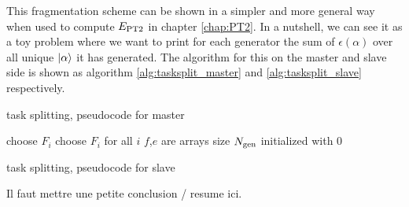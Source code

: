 \documentclass[./thesis.tex]{subfiles}
\begin{document}
This fragmentation scheme can be shown in a simpler and more general way when used to compute $E_\text{PT2}$ in chapter \ref{chap:PT2}. In a nutshell, we can see it as a toy problem where we want to print for each generator the sum of $\epsilon(\alpha)$ over all unique ${\ket{\alpha}}$ it has generated. The algorithm for this on the master and slave side is shown as algorithm \ref{alg:tasksplit_master} and \ref{alg:tasksplit_slave} respectively.


\begin{algorithm}
        \label{alg:tasksplit_master}
        \caption{task splitting, pseudocode for master}
        choose $F_i$ \;
        choose $F_i$ for all $i$\;
        $f$,$e$ are arrays size ${N_\text{gen}}$ initialized with $0$ \;
\end{algorithm}

\begin{algorithm}
        \label{alg:tasksplit_slave}
        \caption{task splitting, pseudocode for slave}
\end{algorithm}


\alert{Il faut mettre une petite conclusion / resume ici.}
\end{document}
